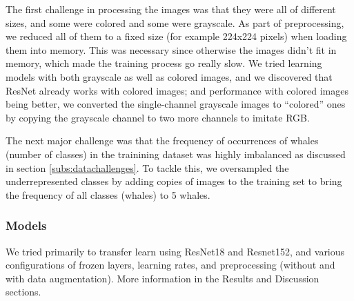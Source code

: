 The first challenge in processing the images was that they were all of different sizes, and some were colored and some were grayscale. As part of preprocessing, we reduced all of them to a fixed size (for example 224x224 pixels) when loading them into memory. This was necessary since otherwise the images didn't fit in memory, which made the training process go really slow. We tried learning models with both grayscale as well as colored images, and we discovered that ResNet already works with colored images; and performance with colored images being better, we converted the single-channel grayscale images to ``colored'' ones by copying the grayscale channel to two more channels to imitate RGB.

The next major challenge was that the frequency of occurrences of whales (number of classes) in the trainining dataset was highly imbalanced as discussed in section \ref{subs:datachallenges}. To tackle this, we oversampled the underrepresented classes by adding copies of images to the training set to bring the frequency of all classes (whales) to 5 whales.

\subsubsection{Models}

We tried primarily to transfer learn using ResNet18 and Resnet152, and various configurations of frozen layers, learning rates, and preprocessing (without and with data augmentation). More information in the Results and Discussion sections.